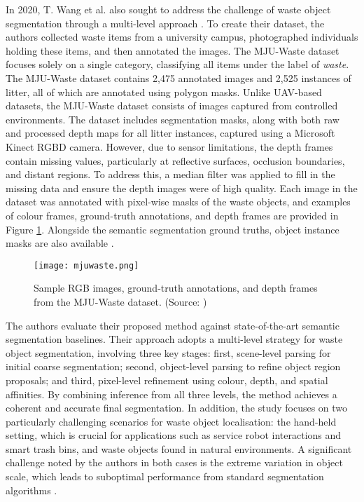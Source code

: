 In 2020, T. Wang et al. also sought to address the challenge of waste object segmentation through a multi-level approach \cite{mju_waste}. To create their dataset, the authors collected waste items from a university campus, photographed individuals holding these items, and then annotated the images. The MJU-Waste dataset focuses solely on a single category, classifying all items under the label of \textit{waste}. The MJU-Waste dataset contains 2,475 annotated images and 2,525 instances of litter, all of which are annotated using polygon masks.
Unlike UAV-based datasets, the MJU-Waste dataset consists of images captured from controlled environments. The dataset includes segmentation masks, along with both raw and processed depth maps for all litter instances, captured using a Microsoft Kinect RGBD camera. However, due to sensor limitations, the depth frames contain missing values, particularly at reflective surfaces, occlusion boundaries, and distant regions. To address this, a median filter was applied to fill in the missing data and ensure the depth images were of high quality. Each image in the dataset was annotated with pixel-wise masks of the waste objects, and examples of colour frames, ground-truth annotations, and depth frames are provided in Figure \ref{fig:mjuwaste}. Alongside the semantic segmentation ground truths, object instance masks are also available \cite{mju_waste}.

\begin{figure}[!htbp]
    \centering
    \texttt{[image: mjuwaste.png]}
    \caption{Sample RGB images, ground-truth annotations, and depth frames from the MJU-Waste dataset. (Source: \cite{mju_waste})}
    \label{fig:mjuwaste}
\end{figure}

The authors evaluate their proposed method against state-of-the-art semantic segmentation baselines. Their approach adopts a multi-level strategy for waste object segmentation, involving three key stages: first, scene-level parsing for initial coarse segmentation; second, object-level parsing to refine object region proposals; and third, pixel-level refinement using colour, depth, and spatial affinities. By combining inference from all three levels, the method achieves a coherent and accurate final segmentation.
In addition, the study focuses on two particularly challenging scenarios for waste object localisation: the hand-held setting, which is crucial for applications such as service robot interactions and smart trash bins, and waste objects found in natural environments. A significant challenge noted by the authors in both cases is the extreme variation in object scale, which leads to suboptimal performance from standard segmentation algorithms \cite{mju_waste}.

